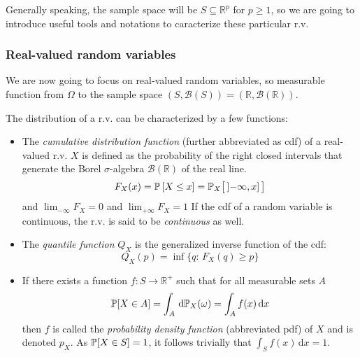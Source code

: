 \documentclass[../../Main_ManuscritThese.tex]{subfiles}
\begin{document}
Generally speaking, the sample space will be $S\subseteq \mathbb{R}^p$ for $p\geq 1$, so we are going to introduce useful tools and notations to caracterize these particular r.v.
\subsubsection{Real-valued random variables}
We are now going to focus on
real-valued random variables, so measurable function from $\Omega$ to
the sample space $(S,\mathcal{B}(S)) =
(\mathbb{R},\mathcal{B}(\mathbb{R}))$.
\begin{definition}
  \label{def:distribution}
  The distribution of a r.v. can be characterized by a few functions:
  \begin{itemize}
  \item The \emph{cumulative distribution function} (further
abbreviated as cdf) of a real-valued r.v. $X$ is defined as the
probability of the right closed intervals that generate the Borel
$\sigma$-algebra $\mathcal{B}(\mathbb{R})$ of the real line.
  \begin{equation} F_{X}(x) = \Prob\left[X \leq x\right] =
\Prob_X\big[\,\interval[open left]{-\infty}{x}\, \big]
  \end{equation} and $\lim_{-\infty}F_X = 0$ and $\lim_{+\infty} F_X
= 1$
If the cdf of a random variable is continuous, the r.v. is said to be \emph{continuous} as well.
  
\item The \emph{quantile function} $Q_X$ is the generalized inverse function
of the cdf:
  \begin{equation} Q_X(p) = \inf\{q:\, F_X(q)\geq p\}
  \end{equation}
\item If there exists a function $f: S\rightarrow \mathbb{R}^{+}$ such that
  for all measurable sets $A$
  \begin{equation} \mathbb{P}[X \in A] = \int_A \,\mathrm{d}\mathbb{P}_X(\omega) = \int_A f(x)\,\mathrm{d}x
\end{equation}
then $f$ is called the \emph{probability density function} (abbreviated pdf) of $X$ and is denoted $p_X$.
As $\mathbb{P}[X \in S] = 1$, it follows trivially that $\int_{S}f(x)\,\mathrm{d}x=1$.



\end{itemize}
\end{definition}
\end{document}
